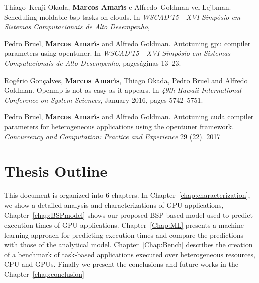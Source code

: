 \begin{itemize}
Thiago~Kenji Okada, {\bf Marcos Amar{\'\i}s} e Alfredo~Goldman vel Lejbman.
\newblock Scheduling moldable bsp tasks on clouds.
\newblock In \emph{WSCAD'15 - XVI Simp{\'o}sio em Sistemas Computacionais de
  Alto Desempenho},
    
Pedro Bruel, {\bf Marcos Amar{\'\i}s} and Alfredo Goldman.
\newblock Autotuning gpu compiler parameters using opentuner.
\newblock In \emph{WSCAD'15 - XVI Simp{\'o}sio em Sistemas Computacionais de
  Alto Desempenho}, pages\'{a}ginas 13--23.
  
  
Rog{\'e}rio Gon{\c{c}}alves, {\bf Marcos Amar{\'\i}s}, Thiago Okada, Pedro Bruel and
  Alfredo Goldman.
\newblock Openmp is not as easy as it appears.
\newblock In \emph{49th Hawaii International Conference on System Sciences}, January-2016,
  pages 5742--5751.

Pedro Bruel, {\bf Marcos Amar{\'\i}s} and Alfredo Goldman.
\newblock Autotuning cuda compiler parameters for heterogeneous applications
  using the opentuner framework.
\newblock \emph{Concurrency and Computation: Practice and Experience}
    29 (22). 2017
\end{itemize}  

\section{Thesis Outline}
This document is organized into 6 chapters. In Chapter~\ref{chap:characterization}, we show a detailed analysis and characterizations of GPU applications, Chapter~\ref{chap:BSPmodel} shows our proposed BSP-based model used to predict execution times of GPU applications. Chapter~\ref{Chap:ML} presents a machine learning approach for predicting execution times and compare the predictions with those of the analytical model. Chapter~\ref{Chap:Bench} describes the creation of a benchmark of task-based applications executed over heterogeneous resources, CPU and GPUs. Finally we present the conclusions and future works in the Chapter~\ref{chap:conclusion}